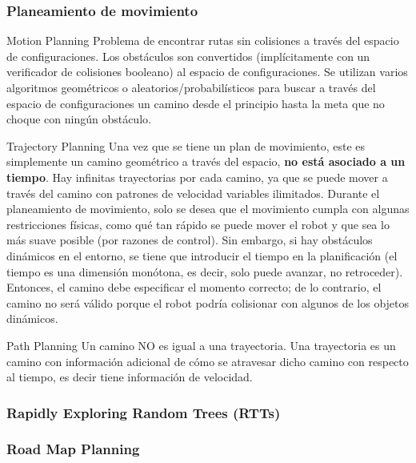 \begin{frame}
	\frametitle{Planeamiento de movimiento}
	
	\begin{block}{Motion Planning}
		Problema de encontrar rutas sin colisiones a través del espacio de configuraciones. Los obstáculos son convertidos (implícitamente con un verificador de colisiones booleano) al espacio de configuraciones. Se utilizan varios algoritmos geométricos o aleatorios/probabilísticos para buscar a través del espacio de configuraciones un camino desde el principio hasta la meta que no choque con ningún obstáculo.
	\end{block}

	\begin{block}{Trajectory Planning}
		Una vez que se tiene un plan de movimiento, este es simplemente un camino geométrico a través del espacio, {\bf no está asociado a un tiempo}. Hay infinitas trayectorias por  cada camino, ya que se puede mover a través del camino con patrones de velocidad variables ilimitados. Durante el planeamiento de movimiento, solo se desea que el movimiento cumpla con algunas restricciones físicas, como qué tan rápido se puede mover el robot y que sea lo más suave posible (por razones de control). Sin embargo, si hay obstáculos dinámicos en el entorno, se tiene que introducir el tiempo en la planificación (el tiempo es una dimensión monótona, es decir, solo puede avanzar, no retroceder). Entonces, el camino debe especificar el momento correcto; de lo contrario, el camino no será válido porque el robot podría colisionar con algunos de los objetos dinámicos.
	\end{block}

	\begin{block}{Path Planning}
	Un camino NO es igual a una trayectoria. Una trayectoria es un camino con información adicional de cómo se atravesar dicho camino con respecto al tiempo, es decir tiene información de velocidad.
	\end{block}
\end{frame}


\begin{frame}
	\frametitle{Rapidly Exploring Random Trees (RTTs)}
	
\end{frame}

\begin{frame}
	\frametitle{Road Map Planning}
	
\end{frame}


